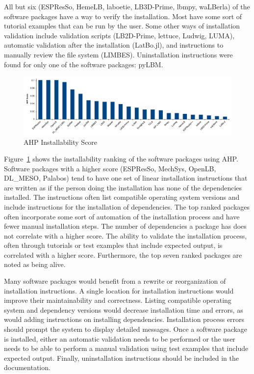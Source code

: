 \documentclass[final, 3p, times, authoryear]{elsarticle}
\begin{document}
All but six (ESPResSo, HemeLB, laboetie, LB3D-Prime, lbmpy, waLBerla) of the
software packages have a way to verify the installation. Most have some sort of
tutorial examples that can be run by the user. Some other ways of installation
validation include validation scripts (LB2D-Prime, lettuce, Ludwig, LUMA),
automatic validation after the installation (LatBo.jl), and instructions to
manually review the file system (LIMBES).  Uninstallation instructions were
found for only one of the software packages: pyLBM.

\begin{figure}[h!]
	\begin{center}
		\includegraphics[width=1.0\textwidth]{./figures/installability_chart.pdf}
		\caption{AHP Installability Score}
		\label{Fig_Installability}
	\end{center}
\end{figure}

Figure~\ref{Fig_Installability} shows the installability ranking of the software
packages using AHP. Software packages with a higher score (ESPResSo, MechSys, OpenLB, DL\_MESO, Palabos) tend to have one set of linear installation instructions that are written as if the person doing the installation has none of the dependencies installed. The instructions often list compatible operating system versions and include instructions for the installation of dependencies. The top ranked packages often incorporate some sort of automation of the installation process and have fewer manual installation steps. The number of dependencies a package has does not correlate with a higher score. The ability to validate the installation process, often through tutorials or test examples that include expected output, is correlated with a higher score. Furthermore, the top seven ranked packages are noted as being alive. 

Many software packages would benefit from a rewrite or reorganization of
installation instructions. A single location for installation instructions would
improve their maintainability and correctness. Listing compatible operating
system and dependency versions would decrease installation time and errors, as
would adding instructions on installing dependencies. Installation process
errors should prompt the system to display detailed messages. Once a software
package is installed, either an automatic validation needs to be performed or
the user needs to be able to perform a manual validation using test examples
that include expected output. Finally, uninstallation instructions should be
included in the documentation. 
 
\end{document}
